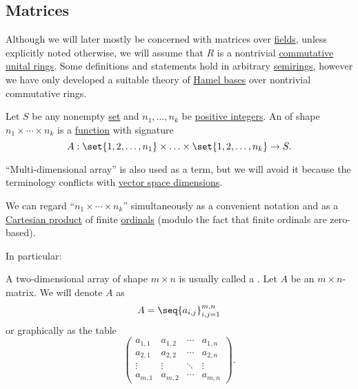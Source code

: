 \subsection{Matrices}\label{subsec:matrices}

Although we will later mostly be concerned with matrices over \hyperref[def:field]{fields}, unless explicitly noted otherwise, we will assume that \( R \) is a nontrivial \hyperref[def:ring/commutative]{commutative unital rings}. Some definitions and statements hold in arbitrary \hyperref[def:semiring]{semirings}, however we have only developed a suitable theory of \hyperref[def:hamel_basis]{Hamel bases} over nontrivial commutative rings.

\begin{definition}\label{def:array}\mimprovised
  Let \( S \) be any nonempty \hyperref[def:set]{set} and \( n_1, \ldots, n_k \) be \hyperref[def:integer_signum]{positive integers}. An  of shape \( n_1 \times \cdots \times n_k \) is a \hyperref[def:function]{function} with signature
  \begin{equation*}
    A: \set{ 1, 2, \ldots, n_1 } \times \ldots \times \set{ 1, 2, \ldots, n_k } \to S.
  \end{equation*}

  \enquote{Multi-dimensional array} is also used as a term, but we will avoid it because the terminology conflicts with \hyperref[thm:vector_space_dimension]{vector space dimensions}.

  We can regard \enquote{\( n_1 \times \cdots \times n_k \)} simultaneously as a convenient notation and as a \hyperref[def:cartesian_product]{Cartesian product} of finite \hyperref[def:ordinal]{ordinals} (modulo the fact that finite ordinals are zero-based).

  In particular:
  \begin{thmenum}
     A two-dimensional array of shape \( m \times n \) is usually called a . Let \( A \) be an \( m \times n \)-matrix. We will denote \( A \) as
    \begin{equation*}
      A = \seq{ a_{i,j} }_{i,j=1}^{m,n}
    \end{equation*}
    or graphically as the table
    \begin{equation*}
      \begin{pmatrix}
        a_{1,1} & a_{1,2} & \cdots & a_{1,n} \\
        a_{2,1} & a_{2,2} & \cdots & a_{2,n} \\
        \vdots  & \vdots  & \ddots & \vdots  \\
        a_{m,1} & a_{m,2} & \cdots & a_{m,n}
      \end{pmatrix}.
    \end{equation*}


\end{thmenum}
\end{definition}
